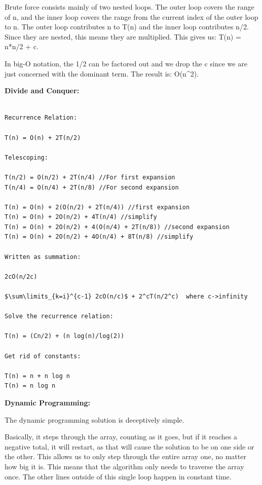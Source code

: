\documentclass[letterpaper,10pt,titlepage,fleqn]{article}
\begin{document}

Brute force consists mainly of two nested loops. The outer loop covers the range of n, and the inner loop covers the range from the current index of the outer loop to n. The outer loop contributes n to T(n) and the inner loop contributes n/2. Since they are nested, this means they are multiplied. This gives us: T(n) = n*n/2 + c.

In big-O notation, the 1/2 can be factored out and we drop the c since we are just concerned with the dominant term. The result is: O(n^2).

\begin{centering}
\textbf{Divide and Conquer:}
\end{centering}


\begin{lstlisting}

Recurrence Relation:

T(n) = O(n) + 2T(n/2)

Telescoping:

T(n/2) = O(n/2) + 2T(n/4) //For first expansion
T(n/4) = O(n/4) + 2T(n/8) //For second expansion

T(n) = O(n) + 2(O(n/2) + 2T(n/4)) //first expansion
T(n) = O(n) + 2O(n/2) + 4T(n/4) //simplify
T(n) = O(n) + 2O(n/2) + 4(O(n/4) + 2T(n/8)) //second expansion
T(n) = O(n) + 2O(n/2) + 4O(n/4) + 8T(n/8) //simplify

Written as summation:

2cO(n/2c)

$\sum\limits_{k=i}^{c-1} 2cO(n/c)$ + 2^cT(n/2^c)  where c->infinity

Solve the recurrence relation:

T(n) = (Cn/2) + (n log(n)/log(2))

Get rid of constants:

T(n) = n + n log n
T(n) = n log n

\end{lstlisting}

\begin{centering}
\textbf{Dynamic Programming:}
\end{centering}


The dynamic programming solution is deceptively simple.

Basically, it steps through the array, counting as it goes, but if it reaches a negative total, it will restart, as that will cause the solution to be on one side or the other.
This allows us to only step through the entire array one, no matter how big it is. This means that the algorithm only needs to traverse the array once. The other lines outside of this single loop happen in constant time. 
\end{document}
